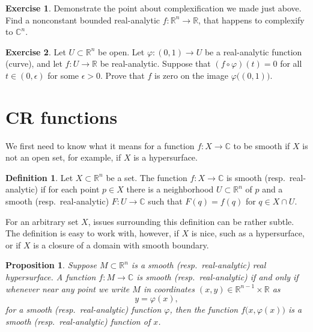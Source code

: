 \documentclass[12pt,openany]{book}
\newcommand{\C}{{\mathbb{C}}}
\newcommand{\R}{{\mathbb{R}}}
\theoremstyle{plain}
\newtheorem{prop}[thm]{Proposition}
\theoremstyle{remark}
\theoremstyle{definition}
\newtheorem{defn}[thm]{Definition}
\newenvironment{exbox}{%
    \def\FrameCommand{\vrule width 1pt \relax\hspace{10pt}}%
    \MakeFramed {\advance \hsize -\width \FrameRestore}%
}{%
    \endMakeFramed
}
\theoremstyle{exercise}
\newtheorem{exercise}{Exercise}[section]
\theoremstyle{example}
\begin{document}
\begin{exbox}
\begin{exercise}
Demonstrate the point about complexification we made just above.
Find a nonconstant bounded real-analytic $f \colon \R^n \to \R$,
that happens to complexify to $\C^n$.
\end{exercise}

\begin{exercise}
Let $U \subset \R^n$ be open.  Let $\varphi \colon (0,1) \to U$ be a
real-analytic function (curve), and let $f \colon U \to \R$ be
real-analytic.  Suppose that $(f \circ \varphi)(t) = 0$ for all $t \in
(0,\epsilon)$ for some $\epsilon > 0$.  Prove that $f$ is zero on the
image $\varphi\bigl((0,1)\bigr)$.
\end{exercise}
\end{exbox}


\section{CR functions}

We first need to know what it means for a function $f \colon X \to \C$
to be smooth if $X$ is not an open set, for example, if $X$ is a hypersurface.

\begin{defn}
Let $X \subset \R^n$ be a set.
The function $f \colon X \to \C$ is smooth (resp.\
real-analytic) if for each point $p \in X$ there is a
neighborhood $U \subset \R^n$ of $p$ and a smooth (resp.\ real-analytic) $F
\colon U \to \C$ such that $F(q) = f(q)$ for $q \in X \cap U$.
\end{defn}

For an arbitrary set $X$, issues surrounding this definition can be
rather subtle.  The definition
is easy to work with,
however, if $X$ is nice, such as a hypersurface, or if $X$ is
a closure of a domain with smooth boundary.

\begin{prop}
Suppose $M \subset \R^n$ is a smooth (resp.\ real-analytic) real hypersurface.
A function $f \colon M \to \C$
is smooth (resp.\ real-analytic) if and only if whenever near any point we write
$M$ in coordinates $(x,y) \in \R^{n-1} \times \R$ as
\begin{equation*}
y = \varphi(x) ,
\end{equation*}
for a smooth (resp.\ real-analytic) function $\varphi$, then
the function $f\bigl(x,\varphi(x)\bigr)$ is a smooth (resp.\ real-analytic) function of $x$.
\end{prop}
\end{document}
